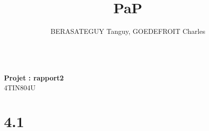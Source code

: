 \documentclass[10pt, a4paper]{article}
\title{PaP}
\author{BERASATEGUY Tanguy, GOEDEFROIT Charles}
\begin{document}
\begin{center}
    \textbf{\LARGE\MyTitle}
    \\[.5cm]
    \textbf{Projet : rapport2}
    \\[.5cm]
    4TIN804U
    \\[.5cm]
    \MyAuthor
\end{center}

\newpage

\tableofcontents

\newpage

\section{4.1}


\end{document}
